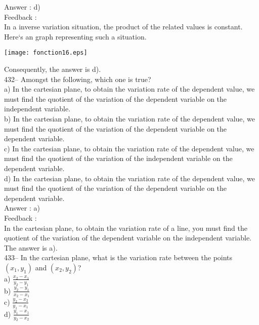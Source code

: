 ﻿\documentclass[letterpaper, 12pt]{article}
\begin{document}
Answer :  d)\\

Feedback : \\
In a inverse variation situation, the product of the related values
is constant. Here`s an graph representing such a situation.\\
    \begin{center}
    \texttt{[image: fonction16.eps]}
    \end{center}

Consequently, the answer is d).\\




432-- Amongst the following, which one is true?\\
a) In the cartesian plane, to obtain the variation rate of the dependent value, we must find the quotient of the variation of the
dependent variable on the independent variable.\\
b) In the cartesian plane, to obtain the variation rate of the dependent value, we must find the quotient of the variation of the
dependent variable on the dependent variable.\\
c) In the cartesian plane, to obtain the variation rate of the dependent value, we must find the quotient of the variation of the
independent variable on the dependent variable.\\
d) In the cartesian plane, to obtain the variation rate of the dependent value, we must find the quotient of the variation of the
dependent variable on the dependent variable.\\

Answer :  a)\\

Feedback : \\
In the cartesian plane, to obtain the variation rate of a line, you must find the quotient of the variation of the dependent variable on the independent variable.  The answer is a).\\

433-- In the cartesian plane, what is the variation rate between the points $\left( x_1,y_1\right)$ and $\left( x_2,y_2\right) $?\\
a) $\frac{x_2-x_1}{y_2-y_1}$\\[2mm]
b) $\frac{y_2-y_1}{x_2-x_1}$\\[2mm]
c) $\frac{y_2-x_2}{y_1-x_1}$\\[2mm]
d) $\frac{y_1-x_1}{y_2-x_2}$\\[2mm]
\end{document}
